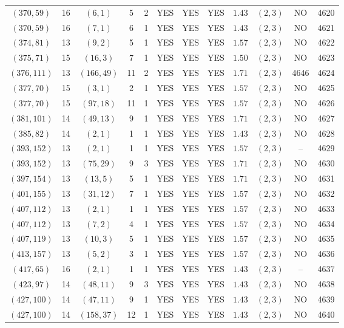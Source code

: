 \begin{longtable}{|c|c|c|c|c|c|c|c|c|c|c|c|}
$(370,59)$ & 16 & $(6,1)$ & 5 & 2 & YES & YES & YES & $1.43$ & $(2,3)$ & NO & 4620\\
$(370,59)$ & 16 & $(7,1)$ & 6 & 1 & YES & YES & YES & $1.43$ & $(2,3)$ & NO & 4621\\
$(374,81)$ & 13 & $(9,2)$ & 5 & 1 & YES & YES & YES & $1.57$ & $(2,3)$ & NO & 4622\\
$(375,71)$ & 15 & $(16,3)$ & 7 & 1 & YES & YES & YES & $1.50$ & $(2,3)$ & NO & 4623\\
$(376,111)$ & 13 & $(166,49)$ & 11 & 2 & YES & YES & YES & $1.71$ & $(2,3)$ & 4646 & 4624\\
$(377,70)$ & 15 & $(3,1)$ & 2 & 1 & YES & YES & YES & $1.57$ & $(2,3)$ & NO & 4625\\
$(377,70)$ & 15 & $(97,18)$ & 11 & 1 & YES & YES & YES & $1.57$ & $(2,3)$ & NO & 4626\\
$(381,101)$ & 14 & $(49,13)$ & 9 & 1 & YES & YES & YES & $1.71$ & $(2,3)$ & NO & 4627\\
$(385,82)$ & 14 & $(2,1)$ & 1 & 1 & YES & YES & YES & $1.43$ & $(2,3)$ & NO & 4628\\
$(393,152)$ & 13 & $(2,1)$ & 1 & 1 & YES & YES & YES & $1.57$ & $(2,3)$ & -- & 4629\\
$(393,152)$ & 13 & $(75,29)$ & 9 & 3 & YES & YES & YES & $1.71$ & $(2,3)$ & NO & 4630\\
$(397,154)$ & 13 & $(13,5)$ & 5 & 1 & YES & YES & YES & $1.71$ & $(2,3)$ & NO & 4631\\
$(401,155)$ & 13 & $(31,12)$ & 7 & 1 & YES & YES & YES & $1.57$ & $(2,3)$ & NO & 4632\\
$(407,112)$ & 13 & $(2,1)$ & 1 & 1 & YES & YES & YES & $1.57$ & $(2,3)$ & NO & 4633\\
$(407,112)$ & 13 & $(7,2)$ & 4 & 1 & YES & YES & YES & $1.57$ & $(2,3)$ & NO & 4634\\
$(407,119)$ & 13 & $(10,3)$ & 5 & 1 & YES & YES & YES & $1.57$ & $(2,3)$ & NO & 4635\\
$(413,157)$ & 13 & $(5,2)$ & 3 & 1 & YES & YES & YES & $1.57$ & $(2,3)$ & NO & 4636\\
$(417,65)$ & 16 & $(2,1)$ & 1 & 1 & YES & YES & YES & $1.43$ & $(2,3)$ & -- & 4637\\
$(423,97)$ & 14 & $(48,11)$ & 9 & 3 & YES & YES & YES & $1.43$ & $(2,3)$ & NO & 4638\\
$(427,100)$ & 14 & $(47,11)$ & 9 & 1 & YES & YES & YES & $1.43$ & $(2,3)$ & NO & 4639\\
$(427,100)$ & 14 & $(158,37)$ & 12 & 1 & YES & YES & YES & $1.43$ & $(2,3)$ & NO & 4640\\

\end{longtable}
